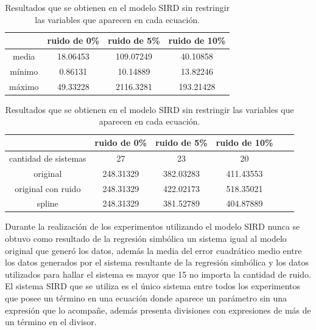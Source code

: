 \begin{table}[!h]
    \centering
    \caption{Resultados que se obtienen en el modelo SIRD sin restringir las variables que aparecen en cada ecuación.}
    \begin{tabular}{|c|c|c|c|}
        \hline
               & \textbf{ruido de 0\%} & \textbf{ruido de 5\%} & \textbf{ruido de 10\%} \\
        \hline
        media  & 18.06453              & 109.07249             & 40.10858               \\
        \hline
        mínimo & 0.86131               & 10.14889              & 13.82246               \\
        \hline
        máximo & 49.33228              & 2116.3281             & 193.21428              \\
        \hline
    \end{tabular}

    \begin{tabular}{|c|c|c|c|c|c|}
        \hline
                             & \textbf{ruido de 0\%} & \textbf{ruido de 5\%} & \textbf{ruido de 10\%} \\
        \hline
        cantidad de sistemas & 27                    & 23                    & 20                     \\
        \hline
        original             & 248.31329             & 382.03283             & 411.43553              \\
        \hline
        original con ruido   & 248.31329             & 422.02173             & 518.35021              \\
        \hline
        spline               & 248.31329             & 381.52789             & 404.87889              \\
        \hline
    \end{tabular}
    \label{table:experiment_SIRD_all}
\end{table}

Durante la realización de los experimentos utilizando el modelo SIRD nunca se obtuvo como resultado de la regresión simbólica un sistema igual al modelo original que generó los datos, además la media del error cuadrático medio entre los datos generados por el sistema resultante de la regresión simbólica y los datos utilizados para hallar el sistema es mayor que 15 no importa la cantidad de ruido. El sistema SIRD que se utiliza es el único sistema entre todos los experimentos que posee un término en una ecuación donde aparece un parámetro sin una expresión que lo acompañe, además presenta divisiones con expresiones de más de un término en el divisor.

